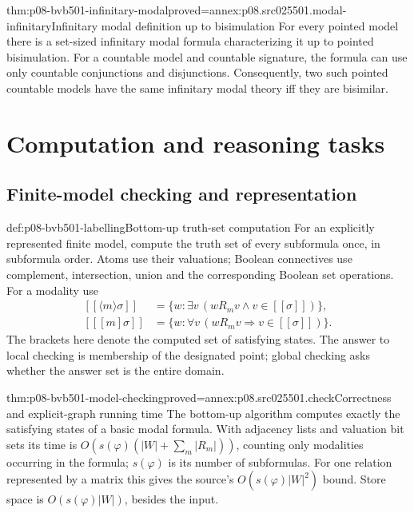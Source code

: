\begin{hbtheorem}{thm:p08-bvb501-infinitary-modal}{proved=annex:p08.src025501.modal-infinitary}{Infinitary modal definition up to bisimulation}
For every pointed model there is a set-sized infinitary modal formula
characterizing it up to pointed bisimulation. For a countable model and
countable signature, the formula can use only countable conjunctions and
disjunctions. Consequently, two such pointed countable models have the same
infinitary modal theory iff they are bisimilar.
\end{hbtheorem}

\section{Computation and reasoning tasks}
\label{sec:p08-bvb501-computation}

\subsection{Finite-model checking and representation}
\label{sec:p08-bvb501-model-checking}

\begin{hbmethod}{def:p08-bvb501-labelling}{Bottom-up truth-set computation}
For an explicitly represented finite model, compute the truth set of every
subformula once, in subformula order. Atoms use their valuations; Boolean
connectives use complement, intersection, union and the corresponding
Boolean set operations. For a modality use
\[
 \begin{aligned}
 [\![\langle m\rangle\sigma]\!]&=
  \{w:\exists v\,(wR_mv\land v\in[\![\sigma]\!])\},\\
 [\![[m]\sigma]\!]&=
  \{w:\forall v\,(wR_mv\Rightarrow v\in[\![\sigma]\!])\}.
 \end{aligned}
\]
The brackets here denote the computed set of satisfying states. The
answer to local checking is membership of the designated point; global
checking asks whether the answer set is the entire domain.
\end{hbmethod}

\begin{hbtheorem}{thm:p08-bvb501-model-checking}{proved=annex:p08.src025501.check}{Correctness and explicit-graph running time}
The bottom-up algorithm computes exactly the satisfying states of a basic
modal formula. With adjacency lists and valuation bit sets its time is
\(O(s(\varphi)(|W|+\sum_m|R_m|))\), counting only modalities
occurring in the formula; \(s(\varphi)\) is its number of subformulas.
For one relation represented by a matrix this gives the source's
\(O(s(\varphi)|W|^2)\) bound. Store space is
\(O(s(\varphi)|W|)\), besides the input.
\end{hbtheorem}

